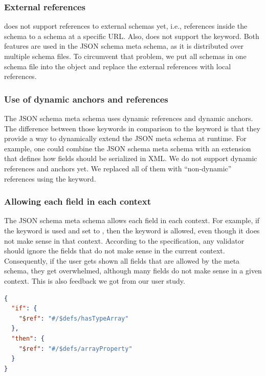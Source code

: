 \subsubsection{External references}
\toolname{} does not support references to external schemas yet, i.e., references inside the schema to a schema at a specific URL\@.
Also, \toolname{} does not support the  keyword.
Both features are used in the JSON schema meta schema, as it is distributed over multiple schema files.
To circumvent that problem, we put all schemas in one schema file into the  object and replace the external references with local references.

\subsubsection{Use of dynamic anchors and references}
The JSON schema meta schema uses dynamic references and dynamic anchors.
The difference between those keywords in comparison to the  keyword is that they provide a way to dynamically extend the JSON meta schema
at runtime.
For example, one could combine the JSON schema meta schema with an extension that defines how fields should be serialized in XML\@.
We do not support dynamic references and anchors yet.
We replaced all of them with ``non-dynamic'' references using the  keyword.

\subsubsection{Allowing each field in each context}
The JSON schema meta schema allows each field in each context.
For example, if the  keyword is used and set to , then the  keyword is allowed,
even though it does not make sense in that context.
According to the specification, any validator should ignore the fields that do not make sense in the current context.
Consequently, if the user gets shown all fields that are allowed by the meta schema, they get overwhelmed, although many fields do not make sense in a given context.
This is also feedback we got from our user study.

\begin{lstlisting}[language=json, firstnumber=1, caption=
    {If condition for array properties. The \texttt{hasTypeArray} is valid if the current property is of type array. The \texttt{arrayProperty} schema defines the properties of an array.}, captionpos=b,label={lst:if-then-else}]
{
  "if": {
    "$ref": "#/$defs/hasTypeArray"
  },
  "then": {
    "$ref": "#/$defs/arrayProperty"
  }
}
\end{lstlisting}

